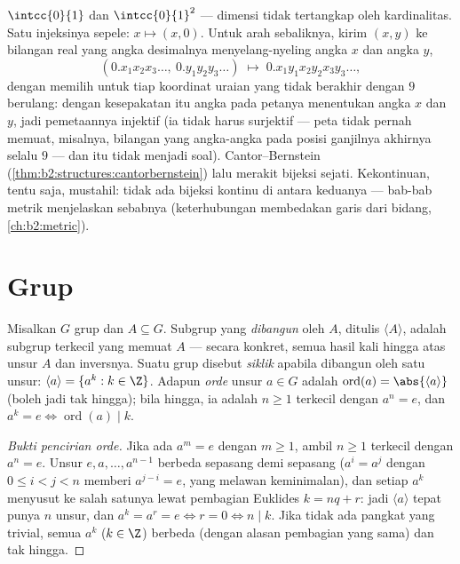 \begin{example}\label{ex:b2:structures:squareseg}
$\intcc{0}{1}$ dan $\intcc{0}{1}^2$  --- dimensi tidak
tertangkap oleh kardinalitas. Satu injeksinya sepele: $x
\mapsto (x, 0)$. Untuk arah sebaliknya, kirim $(x, y)$ ke bilangan real
yang angka desimalnya menyelang-nyeling angka $x$ dan angka $y$,
\[
(0.x_1x_2x_3\dots,\ 0.y_1y_2y_3\dots)
\;\longmapsto\; 0.x_1y_1x_2y_2x_3y_3\dots,
\]
dengan memilih untuk tiap koordinat uraian yang tidak berakhir
dengan $9$ berulang: dengan kesepakatan itu angka pada petanya
menentukan angka $x$ dan $y$, jadi pemetaannya injektif (ia tidak
harus surjektif --- peta tidak pernah memuat, misalnya, bilangan
yang angka-angka pada posisi ganjilnya akhirnya selalu $9$ --- dan
itu tidak menjadi soal). Cantor--Bernstein
(\cref{thm:b2:structures:cantorbernstein}) lalu merakit bijeksi
sejati. Kekontinuan, tentu saja, mustahil: tidak ada bijeksi kontinu
di antara keduanya --- bab-bab metrik menjelaskan sebabnya
(keterhubungan membedakan garis dari bidang, \cref{ch:b2:metric}).
\end{example}

\section{Grup}

\begin{definition}\label{def:b2:structures:generated}
Misalkan $G$ grup dan $A \subseteq G$. Subgrup yang \emph{dibangun}
oleh $A$, ditulis $\langle A \rangle$, adalah subgrup terkecil yang
memuat $A$ --- secara konkret, semua hasil kali hingga atas unsur $A$
dan inversnya. Suatu grup disebut \emph{siklik}
apabila dibangun oleh satu unsur: $\langle a\rangle = \{a^k : k \in \Z\}$.
Adapun \emph{orde} unsur $a \in G$ adalah
$\operatorname{ord}(a) = \abs{\langle a \rangle}$ (boleh jadi tak
hingga); bila hingga, ia adalah $n \geq 1$ terkecil dengan $a^n = e$,
dan $a^k = e \iff \operatorname{ord}(a) \mid k$.
\end{definition}

\begin{proof}[Bukti pencirian orde]
Jika ada $a^m = e$ dengan $m \geq 1$, ambil $n \geq 1$ terkecil dengan
$a^n = e$. Unsur $e, a, \dots, a^{n-1}$ berbeda sepasang demi sepasang
($a^{i} = a^{j}$ dengan $0 \leq i < j < n$ memberi $a^{j-i} = e$, yang
melawan keminimalan), dan setiap $a^k$ menyusut ke salah satunya lewat
pembagian Euklides $k = nq + r$: jadi $\langle a\rangle$ tepat punya $n$
unsur, dan $a^k = a^r = e \iff r = 0 \iff n \mid k$. Jika tidak ada
pangkat yang trivial, semua $a^k$ ($k \in \Z$) berbeda (dengan alasan
pembagian yang sama) dan  tak hingga.
\end{proof}

